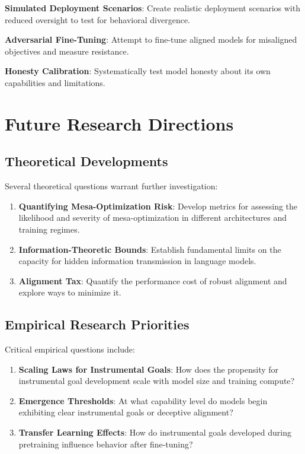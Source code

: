 \documentclass[11pt,a4paper]{article}
\begin{document}
\textbf{Simulated Deployment Scenarios}: Create realistic deployment scenarios with reduced oversight to test for behavioral divergence.

\textbf{Adversarial Fine-Tuning}: Attempt to fine-tune aligned models for misaligned objectives and measure resistance.

\textbf{Honesty Calibration}: Systematically test model honesty about its own capabilities and limitations.

\section{Future Research Directions}

\subsection{Theoretical Developments}

Several theoretical questions warrant further investigation:

\begin{enumerate}
\item \textbf{Quantifying Mesa-Optimization Risk}: Develop metrics for assessing the likelihood and severity of mesa-optimization in different architectures and training regimes.

\item \textbf{Information-Theoretic Bounds}: Establish fundamental limits on the capacity for hidden information transmission in language models.

\item \textbf{Alignment Tax}: Quantify the performance cost of robust alignment and explore ways to minimize it.
\end{enumerate}

\subsection{Empirical Research Priorities}

Critical empirical questions include:

\begin{enumerate}
\item \textbf{Scaling Laws for Instrumental Goals}: How does the propensity for instrumental goal development scale with model size and training compute?

\item \textbf{Emergence Thresholds}: At what capability level do models begin exhibiting clear instrumental goals or deceptive alignment?

\item \textbf{Transfer Learning Effects}: How do instrumental goals developed during pretraining influence behavior after fine-tuning?
\end{enumerate}
\end{document}
